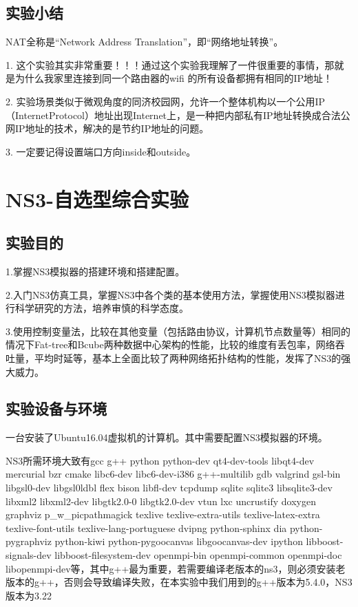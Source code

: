 \documentclass[lang=cn,11pt,a4paper,cite=authoryear]{elegantpaper}
\begin{document}
\subsection{实验小结}

NAT全称是“Network Address Translation”，即“网络地址转换”。

1. 这个实验其实非常重要！！！通过这个实验我理解了一件很重要的事情，那就是为什么我家里连接到同一个路由器的wifi 的所有设备都拥有相同的IP地址！

2. 实验场景类似于微观角度的同济校园网，允许一个整体机构以一个公用IP（InternetProtocol）地址出现Internet上，是一种把内部私有IP地址转换成合法公网IP地址的技术，解决的是节约IP地址的问题。

3. 一定要记得设置端口方向inside和outside。



\section{NS3-自选型综合实验}
\subsection{实验目的}
1.掌握NS3模拟器的搭建环境和搭建配置。

2.入门NS3仿真工具，掌握NS3中各个类的基本使用方法，掌握使用NS3模拟器进行科学研究的方法，培养审慎的科学态度。

3.使用控制变量法，比较在其他变量（包括路由协议，计算机节点数量等）相同的情况下Fat-tree和Bcube两种数据中心架构的性能，比较的维度有丢包率，网络吞吐量，平均时延等，基本上全面比较了两种网络拓扑结构的性能，发挥了NS3的强大威力。
\subsection{实验设备与环境}
一台安装了Ubuntu16.04虚拟机的计算机。其中需要配置NS3模拟器的环境。

NS3所需环境大致有gcc g++ python python-dev qt4-dev-tools libqt4-dev mercurial bzr cmake libc6-dev libc6-dev-i386 g++-multilib gdb valgrind  gsl-bin libgsl0-dev libgsl0ldbl flex bison libfl-dev tcpdump sqlite sqlite3 libsqlite3-dev libxml2 libxml2-dev libgtk2.0-0 libgtk2.0-dev vtun lxc uncrustify doxygen graphviz p\_w\_picpathmagick texlive texlive-extra-utils texlive-latex-extra texlive-font-utils texlive-lang-portuguese dvipng python-sphinx dia python-pygraphviz python-kiwi python-pygoocanvas libgoocanvas-dev ipython libboost-signals-dev libboost-filesystem-dev openmpi-bin openmpi-common openmpi-doc libopenmpi-dev等，其中g++最为重要，若需要编译老版本的ns3，则必须安装老版本的g++，否则会导致编译失败，在本实验中我们用到的g++版本为5.4.0，NS3版本为3.22
\end{document}
